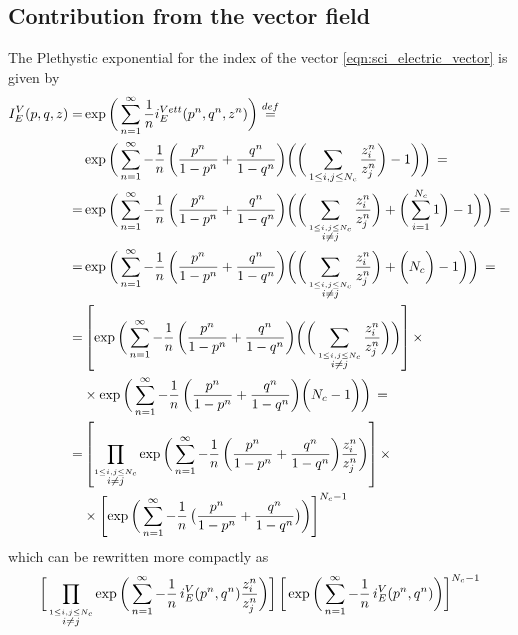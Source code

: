\begin{appendices}
\section{Contribution from the vector field}
The Plethystic exponential for the index of the vector \eqref{eqn:sci_electric_vector} is given by
\begin{equation}
\begin{aligned}
I_E^V(p,q,z) = &\exp \bigg( \sum_{n=1}^{\infty} {1 \over n} i_E^{Vett} (p^n,q^n,z^n) \bigg) \overset{def}{=} \\
 &\exp \bigg( \sum_{n=1}^{\infty} - {1 \over n} \, \bigg( {p^n \over 1-p^n} + {q^n \over 1-q^n} \bigg)  \bigg(\bigg( \sum_{ 1 \leq i,j \leq N_c}  {z_i^n \over z_j^n}  \bigg)- 1 \bigg) \bigg) \, = \\
 =&\exp \bigg( \sum_{n=1}^{\infty} - {1 \over n} \, \bigg( {p^n \over 1-p^n} + {q^n \over 1-q^n} \bigg)  \bigg( \bigg( \sum_{\overset{ 1 \leq i,j \leq N_c}{i \neq j}}  {z_i^n \over z_j^n} \bigg) + \bigg( \sum_{i=1}^{N_c} 1 \bigg)- 1 \bigg) \bigg) \, = \\
  =&\exp \bigg( \sum_{n=1}^{\infty} - {1 \over n} \, \bigg( {p^n \over 1-p^n} + {q^n \over 1-q^n} \bigg)  \bigg( \bigg( \sum_{\overset{ 1 \leq i,j \leq N_c}{i \neq j}}  {z_i^n \over z_j^n} \bigg) + \bigg( N_c \bigg)- 1 \bigg) \bigg) \, = \\
    =&
    \left[  \exp \bigg( \sum_{n=1}^{\infty} - {1 \over n} \, \bigg( {p^n \over 1-p^n} + {q^n \over 1-q^n} \bigg)  \bigg( \bigg( \sum_{\overset{ 1 \leq i,j \leq N_c}{i \neq j}}  {z_i^n \over z_j^n} \bigg) \bigg)\right] \times \\
	&   \times \exp \bigg( \sum_{n=1}^{\infty} - {1 \over n} \, \bigg( {p^n \over 1-p^n} + {q^n \over 1-q^n} \bigg)  \bigg( N_c - 1 \bigg) \bigg) \, = 
\\
=& \left[ \prod_{\overset{ 1 \leq i,j \leq N_c}{i\neq j}} \exp \bigg( \sum_{n=1}^{\infty} - {1 \over n} \, \bigg( {p^n \over 1-p^n} + {q^n \over 1-q^n} \bigg)   {z_i^n \over z_j^n}\bigg) \right]\times  \\
& \times \left[ \exp \bigg( \sum_{n=1}^{\infty} - {1 \over n} \, \big( {p^n \over 1-p^n} + {q^n \over 1-q^n} \big) \bigg) \right] ^{N_c-1}
\end{aligned}
\end{equation}
which can be rewritten more compactly as
\begin{equation}
\bigg[\prod_{\overset{ 1 \leq i,j \leq N_c}{i\neq j}} \exp \bigg( \sum_{n=1}^{\infty} - {1 \over n} \, i_E^V(p^n,q^n)  {z_i^n \over z_j^n}\bigg) \bigg] \,
\bigg[ \exp \bigg( \sum_{n=1}^{\infty} - {1 \over n} \,  i_E^V(p^n,q^n) \bigg) \bigg] ^{N_c-1}

\end{equation}
\end{appendices}
